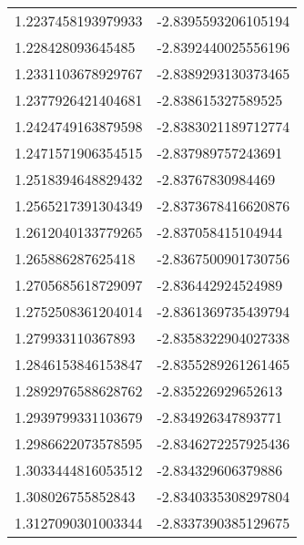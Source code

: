 \begin{supertabular}{ll}
1.2237458193979933  & -2.8395593206105194  \\
1.228428093645485   & -2.8392440025556196  \\
1.2331103678929767  & -2.8389293130373465  \\
1.2377926421404681  & -2.838615327589525   \\
1.2424749163879598  & -2.8383021189712774  \\
1.2471571906354515  & -2.837989757243691   \\
1.2518394648829432  & -2.83767830984469    \\
1.2565217391304349  & -2.8373678416620876  \\
1.2612040133779265  & -2.837058415104944   \\
1.265886287625418   & -2.8367500901730756  \\
1.2705685618729097  & -2.836442924524989   \\
1.2752508361204014  & -2.8361369735439794  \\
1.279933110367893   & -2.8358322904027338  \\
1.2846153846153847  & -2.8355289261261465  \\
1.2892976588628762  & -2.835226929652613   \\
1.2939799331103679  & -2.834926347893771   \\
1.2986622073578595  & -2.8346272257925436  \\
1.3033444816053512  & -2.834329606379886   \\
1.308026755852843   & -2.8340335308297804  \\
1.3127090301003344  & -2.8337390385129675  \\
\end{supertabular}
